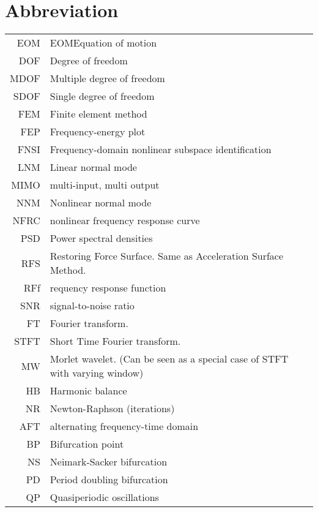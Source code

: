 
\chapter*{Abbreviation}
\label{chap:abbreviation}


\begin{center}
  \begin{tabular}{r l}
    \hline
    EOM & EOMEquation of motion \\
    DOF & Degree of freedom \\
    MDOF & Multiple degree of freedom \\
    SDOF & Single degree of freedom \\
    FEM & Finite element method \\
    FEP & Frequency-energy plot \\
    FNSI & Frequency-domain nonlinear subspace identification\\
    LNM & Linear normal mode \\
    MIMO & multi-input, multi output\\
    NNM & Nonlinear normal mode \\
    NFRC & nonlinear frequency response curve\\
    PSD & Power spectral densities \\
    RFS & Restoring Force Surface. Same as Acceleration Surface Method.\\
    RFf & requency response function \\
    SNR & signal-to-noise ratio\\
    FT & Fourier transform. \\
    STFT & Short Time Fourier transform. \\
    MW & Morlet wavelet. (Can be seen as a special case of STFT with varying window) \\
    HB & Harmonic balance \\
    NR & Newton-Raphson (iterations) \\
    AFT & alternating frequency-time domain \\
    BP & Bifurcation point \\
    NS & Neimark-Sacker bifurcation \\
    PD & Period doubling bifurcation \\
    QP & Quasiperiodic oscillations \\
    \hline
  \end{tabular}
\end{center}

